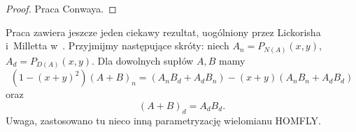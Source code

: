 \begin{proof}
    Praca \cite{conway70} Conwaya.
\end{proof}


\begin{tobedone}
    Praca \cite{conway70} zawiera jeszcze jeden ciekawy rezultat, uogólniony przez Lickorisha i~Milletta w~\cite{lickorish87}.
    Przyjmijmy następujące skróty: niech $A_n = P_{N(A)}(x,y)$, $A_d = P_{D(A)}(x,y)$.
    Dla dowolnych supłów $A, B$ mamy
    \[
    (1 - (x+y)^2)(A+B)_n = (A_nB_d + A_dB_n) - (x+y)(A_nB_n+  A_dB_d)
    \]
    oraz
    \[
        (A+B)_d = A_dB_d.
    \]
    Uwaga, zastosowano tu nieco inną parametryzację wielomianu HOMFLY.
\end{tobedone}




